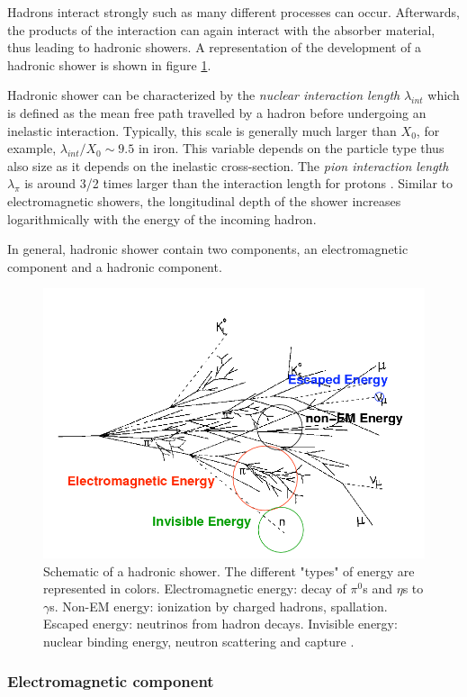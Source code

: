 Hadrons interact strongly such as many different processes can occur. Afterwards, the products of the interaction can again interact with the absorber material, thus leading to hadronic showers. A representation of the development of a hadronic shower is shown in figure \ref{fig:HadShower}.

Hadronic shower can be characterized by the \textit{nuclear interaction length} $\lambda_{int}$ which is defined as the mean free path travelled by a hadron before undergoing an inelastic interaction. Typically, this scale is generally much larger than $X_0$, for example, $\lambda_{int}/X_0 \sim 9.5$ in iron. This variable depends on the particle type thus also size as it depends on the inelastic cross-section. The \textit{pion interaction length} $\lambda_{\pi}$ is around 3/2 times larger than the interaction length for protons \cite{Wigmans:392793}. Similar to electromagnetic showers, the longitudinal depth of the shower increases logarithmically with the energy of the incoming hadron.

In general, hadronic shower contain two components, an electromagnetic component and a hadronic component.

\begin{figure}[htbp!]
  \centering
  \includegraphics[width=0.6\linewidth]{chap2/fig/images_had-shower.png}
  \caption{Schematic of a hadronic shower. The different "types" of energy are represented in colors. Electromagnetic energy: decay of $\pi^0$s and $\eta$s to $\gamma$s. Non-EM energy: ionization by charged hadrons, spallation. Escaped energy: neutrinos from hadron decays. Invisible energy: nuclear binding energy, neutron scattering and capture \cite{Grahn:2009ki}.} \label{fig:HadShower}
\end{figure}

\subsubsection{Electromagnetic component}

